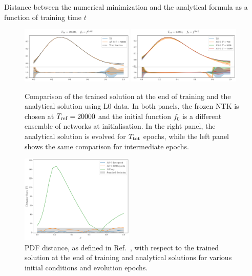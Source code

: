 Distance between the numerical minimization and the analytical formula as a
function of training time $t$



\newpage


\begin{figure}[ht!]
    \centering
    \includegraphics[width=0.48\textwidth]{plots/analytical_solution/pdf_plot_init_last_epoch_L0.pdf}
    \includegraphics[width=0.48\textwidth]{plots/analytical_solution/pdf_plot_init_epochs_L0.pdf}
    \caption{Comparison of the trained solution at the end of training and
    the analytical solution using L0 data. In both panels, the
    frozen NTK is chosen at $T_{\rm ref} = 20000$ and the initial function $f_0$
    is a different ensemble of networks at initialisation. In the right panel,
    the analytical solution is evolved for $T_{\rm tot}$ epochs, while the left
    panel shows the same comparison for intermediate epochs.}
    \label{fig:xT3_analytical_init_L0}
  \end{figure}
  \begin{figure}[ht!]
    \centering
    \includegraphics[width=0.48\textwidth]{plots/analytical_solution/distance_plot_L0.pdf}
    \caption{PDF distance, as defined in Ref.~\cite{NNPDF:2021njg}, with respect to
    the trained solution at the end of training and analytical
    solutions for various initial conditions and evolution epochs.}
    \label{fig:xT3_distance_L0}
  \end{figure}

